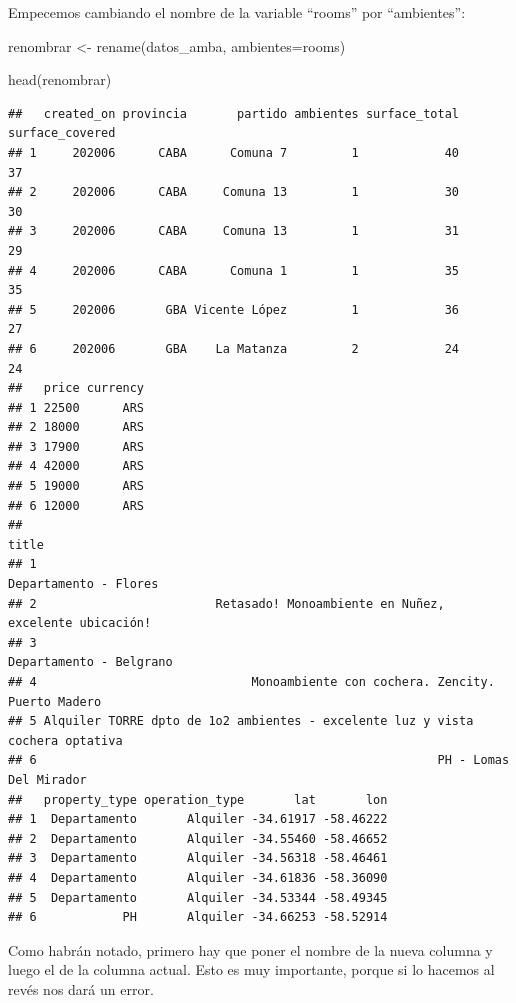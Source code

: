 \documentclass[
  spanish,
]{book}
\newenvironment{Shaded}{\begin{snugshade}}{\end{snugshade}}
\newcommand{\AttributeTok}[1]{\textcolor[rgb]{0.77,0.63,0.00}{#1}}
\newcommand{\FunctionTok}[1]{\textcolor[rgb]{0.00,0.00,0.00}{#1}}
\newcommand{\NormalTok}[1]{#1}
\newcommand{\OtherTok}[1]{\textcolor[rgb]{0.56,0.35,0.01}{#1}}
\begin{document}
Empecemos cambiando el nombre de la variable ``rooms'' por ``ambientes'':

\begin{Shaded}
\begin{Highlighting}[]
\NormalTok{renombrar }\OtherTok{\textless{}{-}} \FunctionTok{rename}\NormalTok{(datos\_amba, }\AttributeTok{ambientes=}\NormalTok{rooms)}

\FunctionTok{head}\NormalTok{(renombrar)}
\end{Highlighting}
\end{Shaded}

\begin{verbatim}
##   created_on provincia       partido ambientes surface_total surface_covered
## 1     202006      CABA      Comuna 7         1            40              37
## 2     202006      CABA     Comuna 13         1            30              30
## 3     202006      CABA     Comuna 13         1            31              29
## 4     202006      CABA      Comuna 1         1            35              35
## 5     202006       GBA Vicente López         1            36              27
## 6     202006       GBA    La Matanza         2            24              24
##   price currency
## 1 22500      ARS
## 2 18000      ARS
## 3 17900      ARS
## 4 42000      ARS
## 5 19000      ARS
## 6 12000      ARS
##                                                                           title
## 1                                                         Departamento - Flores
## 2                         Retasado! Monoambiente en Nuñez, excelente ubicación!
## 3                                                       Departamento - Belgrano
## 4                              Monoambiente con cochera. Zencity. Puerto Madero
## 5 Alquiler TORRE dpto de 1o2 ambientes - excelente luz y vista cochera optativa
## 6                                                        PH - Lomas Del Mirador
##   property_type operation_type       lat       lon
## 1  Departamento       Alquiler -34.61917 -58.46222
## 2  Departamento       Alquiler -34.55460 -58.46652
## 3  Departamento       Alquiler -34.56318 -58.46461
## 4  Departamento       Alquiler -34.61836 -58.36090
## 5  Departamento       Alquiler -34.53344 -58.49345
## 6            PH       Alquiler -34.66253 -58.52914
\end{verbatim}

Como habrán notado, primero hay que poner el nombre de la nueva columna y luego el de la columna actual. Esto es muy importante, porque si lo hacemos al revés nos dará un error.
\end{document}
